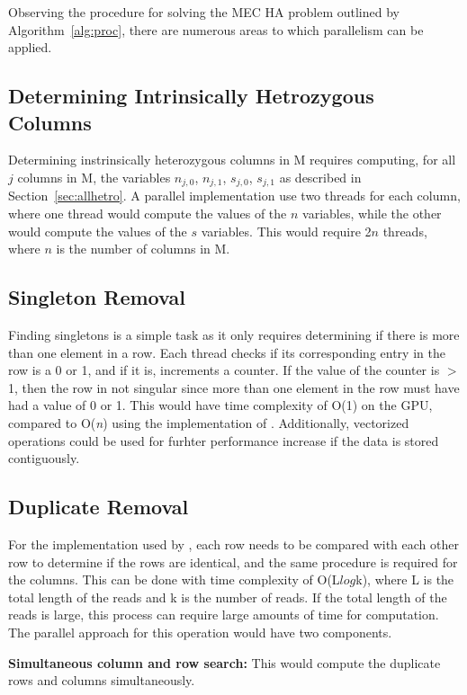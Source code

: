 \documentclass[10pt,twocolumn]{article}
\begin{document}
Observing the procedure for solving the MEC HA problem outlined by Algorithm~\ref{alg:proc}, there are 
numerous areas to which parallelism can be applied.

\subsection{ Determining Intrinsically Hetrozygous Columns}

Determining instrinsically heterozygous columns in M requires computing, for all $j$ columns in M, the
variables $n_{j,0}$, $n_{j,1}$, $s_{j,0}$, $s_{j,1}$ as described in Section~\ref{sec:allhetro}.
A parallel implementation use two threads for each column, where one thread would compute the values of the
$n$ variables, while the other would compute the values of the $s$ variables. This would require 2$n$ threads,
where $n$ is the number of columns in M.

\subsection{Singleton Removal}

Finding singletons is a simple task as it only requires determining if there is more than one element in a
row. Each thread checks if  its corresponding entry in the row is a 0 or 1, and if it is, increments a
counter. If the value of the counter is $>$ 1, then the row in not singular since more than one element in 
the row must have had a value of 0 or 1. This would have time complexity of O(1) on the GPU, compared to 
O(\textit{n}) using the implementation of \cite{chen:2013}. Additionally, vectorized operations could be used
for furhter performance increase if the data is stored contiguously.

\subsection{Duplicate Removal}

For the implementation used by \cite{chen:2013}, each row needs to be compared with each other row to
determine if the rows are identical, and the same procedure is required for the columns. This can be done with
time complexity of O(L$log$k), where L is the total length of the reads and k is the number of reads. If the
total length of the reads is large, this process can require large amounts of time for computation. The 
parallel approach for this operation would have two components.

\textbf{Simultaneous column and row search:} This would compute the duplicate rows and columns simultaneously.
\end{document}
